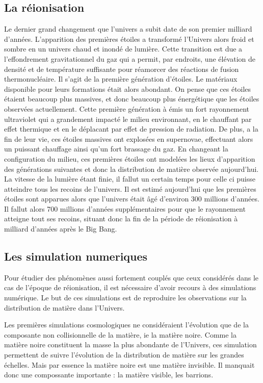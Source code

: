\subsection*{La réionisation}
Le dernier grand changement que l'univers a subit date de son premier milliard d'années.
L'apparition des premières étoiles a transformé l'Univers alors froid et sombre en un univers chaud et inondé de lumière.
Cette transition est due a l'effondrement gravitationnel du gaz qui a permit, par endroits, une élévation de densité et de température suffisante pour réamorcer des réactions de fusion thermonucléaire.
Il s'agit de la première génération d'étoiles.
Le matériaux disponible pour leurs formations était alors abondant.
On pense que ces étoiles étaient beaucoup plus massives, et donc beaucoup plus énergétique que les étoiles observées actuellement.
Cette première génération à émis un fort rayonnement ultraviolet qui a grandement impacté le milieu environnant, en le chauffant par effet thermique et en le déplacant par effet de pression de radiation.
De plus, a la fin de leur vie, ces étoiles massives ont explosées en supernovae, effectuant alors un puissant chauffage ainsi qu'un fort brassage du gaz.
En changeant la configuration du milieu, ces premières étoiles ont modelées les lieux d'apparition des générations suivantes et donc la distribution de matière observée aujourd'hui.
La vitesse de la lumière étant finie, il fallut un certain temps pour celle ci puisse atteindre tous les recoins de l'univers. Il est estimé aujourd'hui que les premières étoiles sont apparues alors que l'univers était âgé d'environ 300 millions d'années. Il fallut alors 700 millions d'années supplémentaires pour que le rayonnement atteigne tout ses recoins, situant donc la fin de la période de  réionisation à milliard d'années après le Big Bang.

\subsection*{Les simulation numeriques}
Pour étudier des phénomènes aussi fortement couplés que ceux considérés dans le cas de l'époque de réionisation, il est nécessaire d'avoir recours à des simulations numérique. 
Le but de ces simulations est de reproduire les observations sur la distribution de matière dans l'Univers.

Les premières simulations cosmologiques ne considéraient l'évolution que de la composante non collisionnelle de la matière, ie la matière noire.
Comme la matière noire constituent la masse la plus abondante de l'Univers, ces simulation permettent de suivre l'évolution de la distribution de matière sur les grandes échelles. 
Mais par essence la matière noire est une matière invisible. 
Il manquait donc une compossante importante : la matière visible, les barrions.

